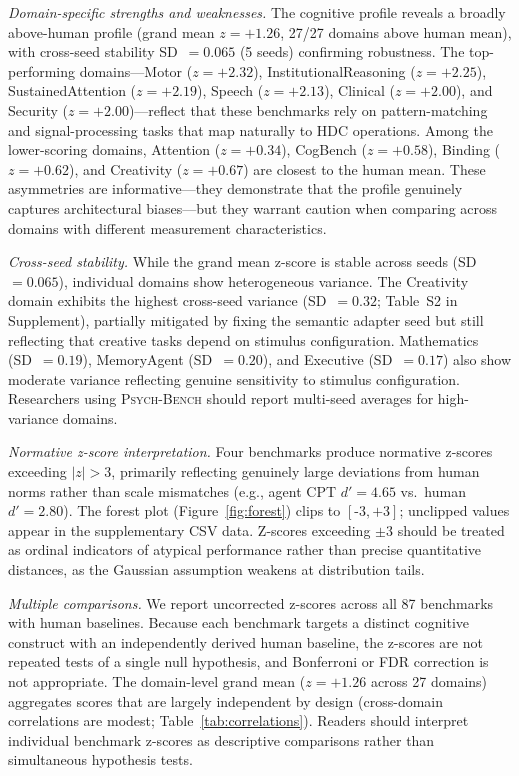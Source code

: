 \documentclass[11pt,letterpaper]{article}
\newcommand{\psychbench}{\textsc{Psych-Bench}}
\begin{document}
\emph{Domain-specific strengths and weaknesses.} The cognitive profile reveals a broadly above-human profile (grand mean $z = +1.26$, 27/27 domains above human mean), with cross-seed stability SD~$= 0.065$ (5 seeds) confirming robustness. The top-performing domains---Motor ($z = +2.32$), InstitutionalReasoning ($z = +2.25$), SustainedAttention ($z = +2.19$), Speech ($z = +2.13$), Clinical ($z = +2.00$), and Security ($z = +2.00$)---reflect that these benchmarks rely on pattern-matching and signal-processing tasks that map naturally to HDC operations. Among the lower-scoring domains, Attention ($z = +0.34$), CogBench ($z = +0.58$), Binding ($z = +0.62$), and Creativity ($z = +0.67$) are closest to the human mean. These asymmetries are informative---they demonstrate that the profile genuinely captures architectural biases---but they warrant caution when comparing across domains with different measurement characteristics.

\emph{Cross-seed stability.} While the grand mean z-score is stable across seeds (SD~$= 0.065$), individual domains show heterogeneous variance. The Creativity domain exhibits the highest cross-seed variance (SD~$= 0.32$; Table~S2 in Supplement), partially mitigated by fixing the semantic adapter seed but still reflecting that creative tasks depend on stimulus configuration. Mathematics (SD~$= 0.19$), MemoryAgent (SD~$= 0.20$), and Executive (SD~$= 0.17$) also show moderate variance reflecting genuine sensitivity to stimulus configuration. Researchers using \psychbench{} should report multi-seed averages for high-variance domains.

\emph{Normative z-score interpretation.} Four benchmarks produce normative z-scores exceeding $|z| > 3$, primarily reflecting genuinely large deviations from human norms rather than scale mismatches (e.g., agent CPT $d' {=} 4.65$ vs.\ human $d' {=} 2.80$). The forest plot (Figure~\ref{fig:forest}) clips to $[\text{-}3, \text{+}3]$; unclipped values appear in the supplementary CSV data. Z-scores exceeding $\pm 3$ should be treated as ordinal indicators of atypical performance rather than precise quantitative distances, as the Gaussian assumption weakens at distribution tails.

\emph{Multiple comparisons.} We report uncorrected z-scores across all 87 benchmarks with human baselines. Because each benchmark targets a distinct cognitive construct with an independently derived human baseline, the z-scores are not repeated tests of a single null hypothesis, and Bonferroni or FDR correction is not appropriate. The domain-level grand mean ($z = +1.26$ across 27 domains) aggregates scores that are largely independent by design (cross-domain correlations are modest; Table~\ref{tab:correlations}). Readers should interpret individual benchmark z-scores as descriptive comparisons rather than simultaneous hypothesis tests.
\end{document}
